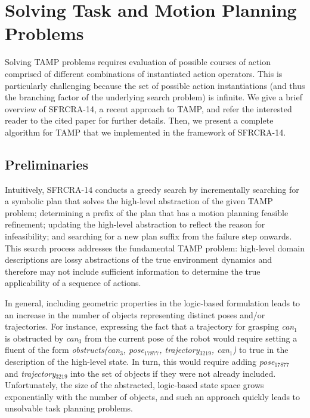 \section{Solving Task and Motion Planning Problems}
Solving TAMP problems requires evaluation of
possible courses of action comprised of different combinations of
instantiated action operators. This is particularly challenging
because the set of possible action instantiations (and thus the
branching factor of the underlying search problem) is infinite.
We give a brief overview of SFRCRA-14, a recent approach to TAMP, and
refer the interested reader to the cited paper for further details.
Then, we present a complete algorithm for TAMP that we implemented in
the framework of SFRCRA-14.

\subsection{Preliminaries}
Intuitively, SFRCRA-14 conducts a greedy search by incrementally
searching for a symbolic plan that solves the high-level abstraction
of the given TAMP problem; determining a prefix of the plan that has a
motion planning feasible refinement; updating the high-level
abstraction to reflect the reason for infeasibility; and searching for
a new plan suffix from the failure step onwards. This search process
addresses the fundamental TAMP problem: high-level
domain descriptions are lossy abstractions of the true environment
dynamics and therefore may not include sufficient information to
determine the true applicability of a sequence of actions.

In general, including geometric properties in the logic-based formulation leads to an
increase in the number of objects representing distinct poses and/or trajectories. For
instance, expressing the fact that a trajectory for grasping \emph{can$_1$} is obstructed by
\emph{can$_3$} from the current pose of the robot would require setting a fluent of the
form \emph{obstructs(can$_3$, pose$_{17877}$, trajectory$_{3219}$, can$_1$)} to true in
the description of the high-level state. In turn, this would require adding
\emph{pose$_{17877}$} and \emph{trajectory$_{3219}$} into the set of objects if they were
not already included. Unfortunately, the size of the abstracted, logic-based state space
grows exponentially with the number of objects, and such an approach quickly leads to
unsolvable task planning problems.

